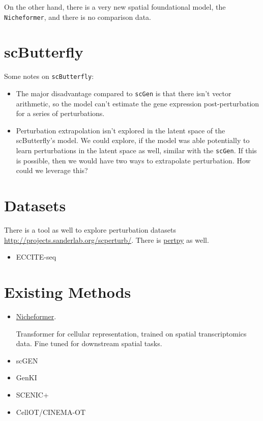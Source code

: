 \documentclass[12pt, a4paper]{article}
\begin{document}
On the other hand, there is a very new spatial foundational model, the \verb|Nicheformer|, and there is no comparison data.

\clearpage

\section{scButterfly}


Some notes on \verb|scButterfly|:

\begin{itemize}
  \item The major disadvantage compared to \verb|scGen| is that there isn't vector arithmetic, so the model can't estimate the gene expression post-perturbation for a series of perturbations.
  \item Perturbation extrapolation isn't explored in the latent space of the scButterfly's model. We could explore, if the model was able potentially to learn perturbations in the latent space as well, similar with the \verb|scGen|. If this is possible, then we would have two ways to extrapolate perturbation. How could we leverage this?
\end{itemize}


\clearpage

\section{Datasets}

There is a tool as well to explore perturbation datasets \url{http://projects.sanderlab.org/scperturb/}. There is \href{https://github.com/scverse/pertpy}{pertpy} as well.

\begin{itemize}
  \item ECCITE-seq
\end{itemize}

\section{Existing Methods}

\begin{itemize}
  \item \href{https://www.biorxiv.org/content/10.1101/2024.04.15.589472v1}{Nicheformer}.
  
  Transformer for cellular representation, trained on spatial transcriptomics data. Fine tuned for downstream spatial tasks.

  \item scGEN
  \item GenKI
  \item SCENIC+
  \item CellOT/CINEMA-OT
\end{itemize}
\end{document}
